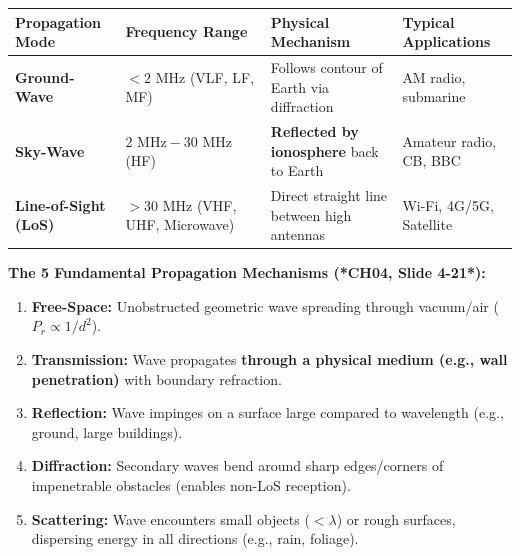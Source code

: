 \documentclass[10pt,a4paper]{article}
\begin{document}
\vspace{2pt}

\par\vspace{2pt}

\begin{center}
\small
\begin{tabular}{p{3.2cm} p{4.2cm} p{5.5cm} p{2.8cm}}
\toprule
\rowcolor{lightbg}
\textbf{Propagation Mode} & \textbf{Frequency Range} & \textbf{Physical Mechanism} & \textbf{Typical Applications} \\
\midrule
\textbf{Ground-Wave} & $< 2\text{ MHz}$ (VLF, LF, MF) & Follows contour of Earth via diffraction & AM radio, submarine \\
\textbf{Sky-Wave} & $2\text{ MHz} - 30\text{ MHz}$ (HF) & \textbf{Reflected by ionosphere} back to Earth & Amateur radio, CB, BBC \\
\textbf{Line-of-Sight (LoS)} & $> 30\text{ MHz}$ (VHF, UHF, Microwave) & Direct straight line between high antennas & Wi-Fi, 4G/5G, Satellite \\
\bottomrule
\end{tabular}
\end{center}

\vspace{-4pt}

\begin{tcolorbox}[
    colframe=themeblue,
    colback=white,
    arc=1.2mm,
    boxrule=0.5pt,
    left=5pt, right=5pt, top=2.5pt, bottom=2.5pt
]
\footnotesize
\textbf{The 5 Fundamental Propagation Mechanisms (*CH04, Slide 4-21*):}
\begin{enumerate}[leftmargin=12pt, itemsep=0.5pt, topsep=0.5pt]
    \item \textbf{Free-Space:} Unobstructed geometric wave spreading through vacuum/air ($P_r \propto 1/d^2$).
    \item \textbf{Transmission:} Wave propagates \textbf{through a physical medium (e.g., wall penetration)} with boundary refraction.
    \item \textbf{Reflection:} Wave impinges on a surface large compared to wavelength (e.g., ground, large buildings).
    \item \textbf{Diffraction:} Secondary waves bend around sharp edges/corners of impenetrable obstacles (enables non-LoS reception).
    \item \textbf{Scattering:} Wave encounters small objects ($<\lambda$) or rough surfaces, dispersing energy in all directions (e.g., rain, foliage).
\end{enumerate}
\end{tcolorbox}
\end{document}
